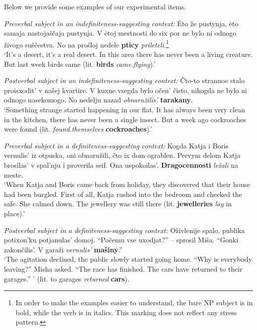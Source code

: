 \documentclass[output=paper]{langsci/langscibook}
\begin{document}
\largerpage[2]
Below we provide some examples of our experimental items. 

\begin{exe}
\ex\label{2ex:14}
{\emph{Preverbal subject in an indefiniteness-suggesting context:}}
\exi{}
{
Ėto \v{z}e pustynja, ėto samaja nastoja\v{s}\v{c}aja pustynja. 
V ėtoj mestnosti do six por ne bylo ni odnogo \v{z}ivogo su\v{s}\v{c}estva. 
No na pro\v{s}loj nedele {\textbf{pticy}} {\emph{prileteli}}}.\footnote{In order to make the examples easier to understand, the bare NP subject is in bold, while the verb is in italics. This marking does not reflect any stress pattern.}\\
`It's a desert, it's a real desert. In this area there has never been a living creature. But last week birds came (lit. {\textbf{birds}} {\emph{came.flying}}).'

\ex\label{2ex:15}
{\emph{Postverbal subject in an indefiniteness-suggesting context:}}
\exi{}
\v{C}to-to strannoe stalo proisxodit' v na\v{s}ej kvartire. 
V kuxne vsegda bylo o\v{c}en' \v{c}isto, nikogda ne bylo ni odnogo nasekomogo. 
No nedelju nazad {\emph{obnaru\v{z}ilis'}} {\textbf{tarakany}}. \\
`Something strange started happening in our flat. It has always been very clean in the kitchen, there has never been a single insect. But a week ago cockroaches were found (lit. {\emph{found.themselves}} {\textbf{cockroaches}}).'

\ex\label{2ex:16}
{\emph{Preverbal subject in a definiteness-suggesting context:}}
\exi{}
Kogda Katja i Boris vernulis' iz otpuska, oni obnaru\v{z}ili, \v{c}to ix dom ograblen. 
Pervym delom Katja brosilas' v spal'nju i proverila seif. 
Ona uspokoilas'. 
{\textbf{Dragocennosti}} {\emph{le\v{z}ali}} na meste. \\
`When Katja and Boris came back from holiday, they discovered that their house had been burgled. First of all, Katja rushed into the bedroom and checked the safe. She calmed down. The jewellery was still there (lit. {\textbf{jewelleries}} {\emph{lay}} in place).'

\ex\label{2ex:17}
{\emph{Postverbal subject in a definiteness-suggesting context:}}
\exi{}
O\v{z}ivlenije spalo, publika potixon'ku potjanulas' domoj. 
``Po\v{c}emu vse uxodjat?'' -- sprosil Mi\v{s}a. 
``Gonki zakon\v{c}ilis'. V gara\v{z}i {\emph{vernulis'}} {\textbf{ma\v{s}iny}}.'' \\
`The agitation declined, the public slowly started going home. ``Why is everybody leaving?'' Misha asked. ``The race has finished. The cars have returned to their garages.'' ' (lit. to garages {\emph{returned}} {\textbf{cars}}).
\end{exe}
\end{document}
